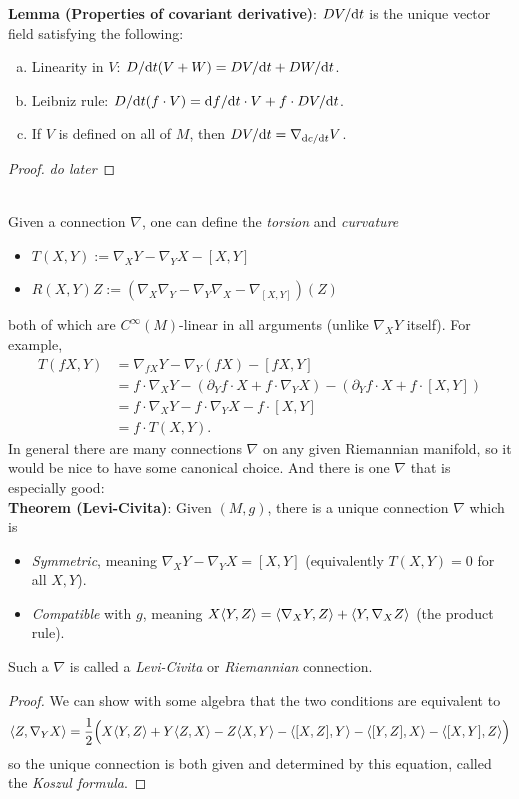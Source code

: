 \documentclass{amsart}
\begin{document}
	\textbf{Lemma (Properties of covariant derivative)}: $DV/\textrm{d} t$ is the unique vector field satisfying the following:
	\begin{enumerate}[(a)]
		\item Linearity in $V$: $D/\textrm{d} t(V+W) = DV/\textrm{d} t + DW/\textrm{d} t$.
		\item Leibniz rule: $D/\textrm{d} t (f\cdot V) = \textrm{d} f/\textrm{d} t \cdot V + f \cdot DV/\textrm{d} t$.
		\item If $V$ is defined on all of $M$, then $DV/\textrm{d} t = \nabla_{\textrm{d} c/\textrm{d} t} V$.
	\end{enumerate}
	\begin{proof}
		\textit{do later}
	\end{proof}\\
	
	Given a connection $\nabla$, one can define the \textit{torsion} and \textit{curvature}
	\begin{itemize}
		\item $T(X,Y) := \nabla_X Y - \nabla_Y X - [X,Y]$
		\item $R(X,Y)Z := (\nabla_X \nabla_Y- \nabla_Y\nabla_X - \nabla_{[X,Y]})(Z)$
	\end{itemize}
	both of which are $C^{\infty}(M)$-linear in all arguments (unlike $\nabla_X Y$ itself). For example, 
	\begin{align*}
	T(fX,Y) &= \nabla_{fX} Y - \nabla_Y (fX) - [fX,Y]\\
	&= f\cdot \nabla_X Y - (\partial_Y f \cdot X + f\cdot \nabla_Y X) - (\partial_Y f\cdot X + f\cdot [X,Y])\\
	&= f\cdot \nabla_X Y - f\cdot \nabla_Y X - f\cdot [X,Y]\\
	&= f\cdot T(X,Y).
	\end{align*}
	In general there are many connections $\nabla$ on any given Riemannian manifold, so it would be nice to have some canonical choice. And there is one $\nabla$ that is especially good:\\
	
	\textbf{Theorem (Levi-Civita)}: Given $(M,g)$, there is a unique connection $\nabla$ which is
	\begin{itemize}
		\item \textit{Symmetric}, meaning $\nabla_X Y - \nabla_Y X = [X,Y]$ (equivalently $T(X,Y)=0$ for all $X,Y$).
		\item \textit{Compatible} with $g$, meaning $X\langle Y,Z\rangle= \langle\nabla_X Y,Z\rangle + \langle Y,\nabla_X Z\rangle$ (the product rule).
	\end{itemize}
	Such a $\nabla$ is called a \textit{Levi-Civita} or \textit{Riemannian} connection.
	\begin{proof}
		We can show with some algebra that the two conditions are equivalent to
		$$
		\langle Z,\nabla_YX\rangle = \frac12 \Big(X\langle Y,Z\rangle + Y\langle Z,X\rangle - Z\langle X,Y\rangle - \langle[X,Z],Y\rangle - \langle[Y,Z],X\rangle - \langle[X,Y],Z\rangle\Big)
		$$
		so the unique connection is both given and determined by this equation, called the \textit{Koszul formula}.
	\end{proof}\\
	
\end{document}
